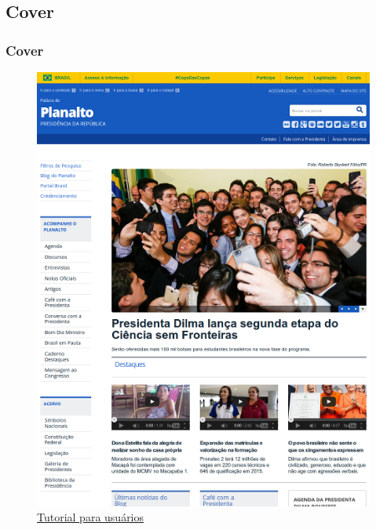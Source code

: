 \documentclass{beamer}
\begin{document}
\subsection{Cover}
\begin{frame}
    \frametitle{Cover}
    \begin{figure}
        \includegraphics[height=.7\textheight]{./img/001-008_-_cover.png}
        \caption{\href{https://github.com/collective/collective.cover/blob/master/docs/end-user.rst}{Tutorial para usuários}}
    \end{figure}
\end{frame}
\end{document}

